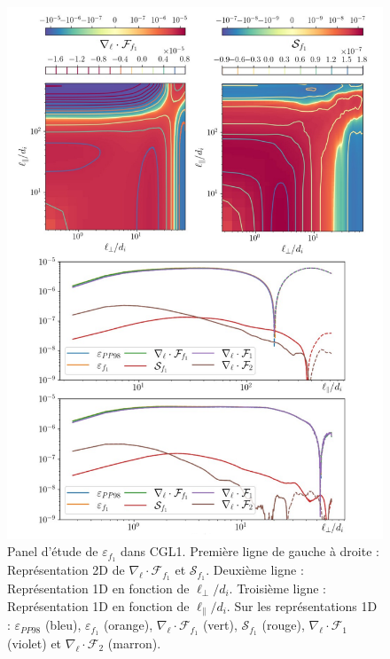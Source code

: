  \begin{figure}[!ht]
  \centering
 \includegraphics[width=0.8\linewidth,trim=0cm 0cm 0cm 0cm, clip=true]{./Mainmatter/Part_3/images_ch2/CGL1_f1}
 \cprotect\caption{Panel d'étude de \ensuremath{\varepsilon_{f_1}} dans CGL1. Première ligne de gauche à droite : Représentation 2D de \ensuremath{\nabla_{\boldsymbol{\ell}} \cdot \mathcal{F}_{f_1}}  et \ensuremath{\mathcal{S}_{f_1}}. Deuxième ligne : Représentation 1D en fonction de \ensuremath{\ell_{\perp}/d_i}. Troisième ligne : Représentation 1D en fonction de \ensuremath{\ell_{\parallel}/d_i}. Sur les représentations 1D : \ensuremath{\varepsilon_{PP98}} (bleu), \ensuremath{\varepsilon_{f_1}} (orange), \ensuremath{\nabla_{\boldsymbol{\ell}} \cdot \mathcal{F}_{f_1}} (vert), \ensuremath{\mathcal{S}_{f_1}} (rouge),  \ensuremath{\nabla_{\boldsymbol{\ell}} \cdot \mathcal{F}_1} (violet)  et \ensuremath{\nabla_{\boldsymbol{\ell}} \cdot \mathcal{F}_2} (marron).}
 \label{fig:elf1_CGL1}
 \end{figure}
